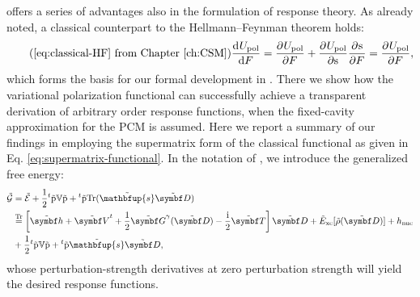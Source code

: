 offers a series of advantages also in the formulation of response
theory. As already noted, a classical counterpart to the
Hellmann--Feynman theorem holds:
\begin{equation}\tag{\ref{eq:classical-HF} from Chapter \ref{ch:CSM}}
  \deriv{U_\mathrm{pol}}{F} = \pderiv{U_\mathrm{pol}}{F}
  + \pderiv{U_\mathrm{pol}}{\s}\pderiv{\s}{F}
  = \pderiv{U_\mathrm{pol}}{F},
\end{equation}
which forms the basis for our formal development in
.\autocite{pcm-openrsp}
There we show how the variational polarization functional can
successfully achieve a transparent derivation of arbitrary order
response functions, when the fixed-cavity approximation for the
\acrshort{PCM} is assumed.
Here we report a summary of our findings in  employing the
supermatrix form of the classical functional as given in Eq.
\eqref{eq:supermatrix-functional}.
In the notation of \citeauthor{Thorvaldsen2008-sg}, we introduce the
generalized free energy:
\begin{equation}\label{eq:generalized-KS-energy}
  \begin{aligned}
 \tilde{\mathcal{G}}
 &=
 \tilde{\mathcal{E}}
 + \frac{1}{2}{}^t\tilde{\p}\V\tilde{\p} +
 {}^t\tilde{\p}\Tr(\tilde{\mathbfup{s}}\pertmat{D}) \\
 &\eqtr
 \left[\pertmat{h} + \pertmat{V}^{t} +
 \frac{1}{2}\pertmat{G}^{\gamma}(\pertmat{D}) -
 \frac{\mathrm{i}}{2}\pertmat{T}\right]\pertmat{D}
 + \tilde{E}_\mathrm{xc}[\tilde{\rho}(\pertmat{D})] + h_\mathrm{nuc} \\
 &+ \frac{1}{2}{}^t\tilde{\p}\V\tilde{\p}
 + {}^t\tilde{\p}\tilde{\mathbfup{s}}\pertmat{D},
 \end{aligned}
\end{equation}
whose perturbation-strength derivatives at zero perturbation strength
will yield the desired response functions.

